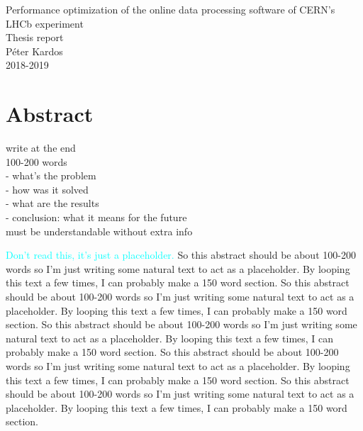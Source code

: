 \documentclass[12pt]{article}
\begin{document}
	

\begin{center}
	\Huge Performance optimization of the online data processing software of CERN's LHCb experiment\\
	\Large Thesis report\\
	\vspace{1pc}
	\huge Péter Kardos \\
	\large 2018-2019
\end{center}


\section{Abstract}

\color{red}
write at the end \\
100-200 words \\
- what's the problem \\
- how was it solved \\
- what are the results \\
- conclusion: what it means for the future \\
must be understandable without extra info	
\color{black}
\vspace{1.5pc}
	
\textcolor{cyan}{Don't read this, it's just a placeholder.}
So this abstract should be about 100-200 words so I'm just writing some natural text to act as a placeholder. By looping this text a few times, I can probably make a 150 word section. So this abstract should be about 100-200 words so I'm just writing some natural text to act as a placeholder. By looping this text a few times, I can probably make a 150 word section. So this abstract should be about 100-200 words so I'm just writing some natural text to act as a placeholder. By looping this text a few times, I can probably make a 150 word section. So this abstract should be about 100-200 words so I'm just writing some natural text to act as a placeholder. By looping this text a few times, I can probably make a 150 word section. So this abstract should be about 100-200 words so I'm just writing some natural text to act as a placeholder. By looping this text a few times, I can probably make a 150 word section.
\end{document}
